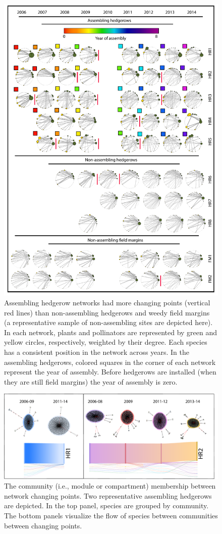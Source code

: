 \documentclass[12pt]{article}
\begin{document}
\begin{figure}
  \centering
  \includegraphics[width=.8\textwidth]{../analysis/changePoint/plotting/networks.pdf}
  \caption{Assembling hedgerow networks had more changing points
    (vertical red lines) than non-assembling hedgerows and weedy field
    margins (a representative sample of non-assembling sites are
    depicted here). In each network, plants and pollinators are
    represented by green and yellow circles, respectively, weighted by
    their degree. Each species has a consistent position in the
    network across years. In the assembling hedgerows, colored squares
    in the corner of each network represent the year of
    assembly. Before hedgerows are installed (when they are still
    field margins) the year of assembly is zero.}
  \label{fig:changePoints}
\end{figure}
\clearpage

\begin{figure}
  \centering
  \includegraphics[width=.9\textwidth]{../analysis/changePoint/plotting/communitiesSkanky2.pdf}
  \caption{The community (i.e., module or compartment) membership
    between network changing points. Two representative assembling
    hedgerows are depicted. In the top panel, species are grouped by
    community. The bottom panels visualize the flow of species between
    communities between changing points. }
  \label{fig:changePoints2}
\end{figure}
\clearpage
\end{document}
